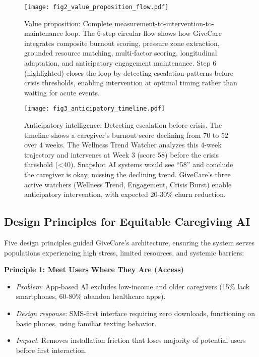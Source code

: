 \documentclass{article}
\begin{document}
\begin{figure}[h]
\centering
\texttt{[image: fig2\_value\_proposition\_flow.pdf]}
\caption{Value proposition: Complete measurement-to-intervention-to-maintenance loop. The 6-step circular flow shows how GiveCare integrates composite burnout scoring, pressure zone extraction, grounded resource matching, multi-factor scoring, longitudinal adaptation, and anticipatory engagement maintenance. Step 6 (highlighted) closes the loop by detecting escalation patterns before crisis thresholds, enabling intervention at optimal timing rather than waiting for acute events.}
\label{fig:value_proposition}
\end{figure}

\begin{figure}[h]
\centering
\texttt{[image: fig3\_anticipatory\_timeline.pdf]}
\caption{Anticipatory intelligence: Detecting escalation before crisis. The timeline shows a caregiver's burnout score declining from 70 to 52 over 4 weeks. The Wellness Trend Watcher analyzes this 4-week trajectory and intervenes at Week 3 (score 58) before the crisis threshold (<40). Snapshot AI systems would see ``58'' and conclude the caregiver is okay, missing the declining trend. GiveCare's three active watchers (Wellness Trend, Engagement, Crisis Burst) enable anticipatory intervention, with expected 20-30\% churn reduction.}
\label{fig:anticipatory_timeline}
\end{figure}

\subsection{Design Principles for Equitable Caregiving AI}

Five design principles guided GiveCare's architecture, ensuring the system serves populations experiencing high stress, limited resources, and systemic barriers:

\textbf{Principle 1: Meet Users Where They Are (Access)}
\begin{itemize}
    \item \textit{Problem}: App-based AI excludes low-income and older caregivers (15\% lack smartphones, 60-80\% abandon healthcare apps).
    \item \textit{Design response}: SMS-first interface requiring zero downloads, functioning on basic phones, using familiar texting behavior.
    \item \textit{Impact}: Removes installation friction that loses majority of potential users before first interaction.
\end{itemize}
\end{document}
